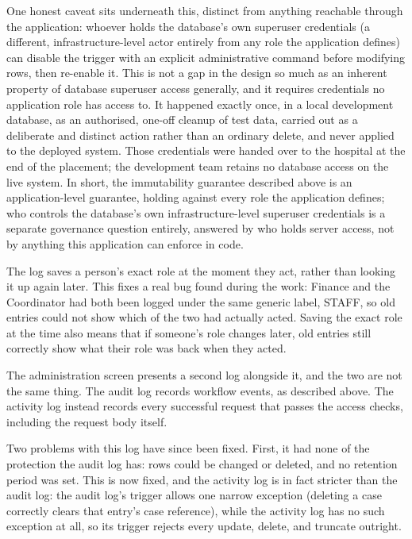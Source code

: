 One honest caveat sits underneath this, distinct from anything reachable through the application: whoever holds the database's own superuser credentials (a different, infrastructure-level actor entirely from any role the application defines) can disable the trigger with an explicit administrative command before modifying rows, then re-enable it. This is not a gap in the design so much as an inherent property of database superuser access generally, and it requires credentials no application role has access to. It happened exactly once, in a local development database, as an authorised, one-off cleanup of test data, carried out as a deliberate and distinct action rather than an ordinary delete, and never applied to the deployed system. Those credentials were handed over to the hospital at the end of the placement; the development team retains no database access on the live system. In short, the immutability guarantee described above is an application-level guarantee, holding against every role the application defines; who controls the database's own infrastructure-level superuser credentials is a separate governance question entirely, answered by who holds server access, not by anything this application can enforce in code.

The log saves a person's exact role at the moment they act, rather than looking it up again later. This fixes a real bug found during the work: Finance and the Coordinator had both been logged under the same generic label, STAFF, so old entries could not show which of the two had actually acted. Saving the exact role at the time also means that if someone's role changes later, old entries still correctly show what their role was back when they acted.

The administration screen presents a second log alongside it, and the two are not the same thing. The audit log records workflow events, as described above. The activity log instead records every successful request that passes the access checks, including the request body itself.

Two problems with this log have since been fixed. First, it had none of the protection the audit log has: rows could be changed or deleted, and no retention period was set. This is now fixed, and the activity log is in fact stricter than the audit log: the audit log's trigger allows one narrow exception (deleting a case correctly clears that entry's case reference), while the activity log has no such exception at all, so its trigger rejects every update, delete, and truncate outright.

